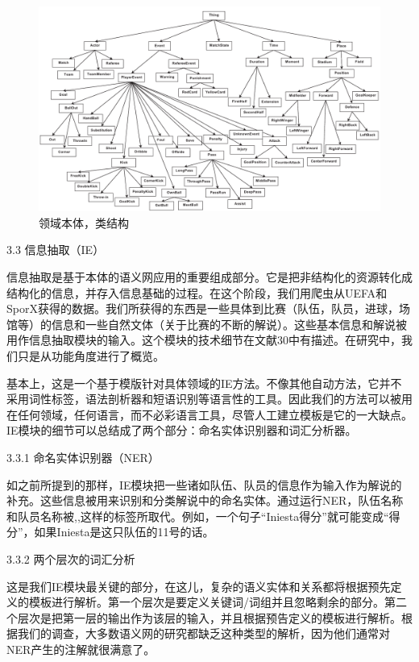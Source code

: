 	\begin{figure}[htbp] 
	\centering\includegraphics[width=5in]{fig/trans/fig2.png} 
	\caption[]{\xiaosihao 领域本体，类结构}
	\end{figure} 

3.3 信息抽取（{\Times IE}）

信息抽取是基于本体的语义网应用的重要组成部分。它是把非结构化的资源转化成结构化的信息，并存入信息基础的过程。在这个阶段，我们用爬虫从{\Times UEFA}和{\Times SporX}获得的数据。我们所获得的东西是一些具体到比赛（队伍，队员，进球，场馆等）的信息和一些自然文体（关于比赛的不断的解说）。这些基本信息和解说被用作信息抽取模块的输入。这个模块的技术细节在文献30中有描述。在研究中，我们只是从功能角度进行了概览。

基本上，这是一个基于模版针对具体领域的{\Times IE}方法。不像其他自动方法，它并不采用词性标签，语法剖析器和短语识别等语言性的工具。因此我们的方法可以被用在任何领域，任何语言，而不必彩语言工具，尽管人工建立模板是它的一大缺点。{\Times IE}模块的细节可以总结成了两个部分：命名实体识别器和词汇分析器。

3.3.1 命名实体识别器（{\Times NER}）

如之前所提到的那样，{\Times IE}模块把一些诸如队伍、队员的信息作为输入作为解说的补充。这些信息被用来识别和分类解说中的命名实体。通过运行{\Times NER}，队伍名称和队员名称被{},{},{}这样的标签所取代。例如，一个句子“{\Times Iniesta}得分”就可能变成“{}得分”，如果{\Times Iniesta}是这只队伍的11号的话。

3.3.2 两个层次的词汇分析

这是我们{\Times IE}模块最关键的部分，在这儿，复杂的语义实体和关系都将根据预先定义的模板进行解析。第一个层次是要定义关键词/词组并且忽略剩余的部分。第二个层次是把第一层的输出作为该层的输入，并且根据预告定义的模板进行解析。根据我们的调查，大多数语义网的研究都缺乏这种类型的解析，因为他们通常对NER产生的注解就很满意了。

